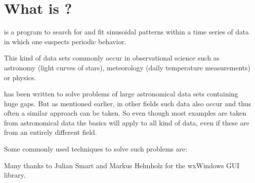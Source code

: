 \section{What is \periodname?}

\period is a program
to search for and fit sinusoidal patterns within a time series
of data in which one suspects periodic behavior.

This kind of data sets commonly occur in observational science such as
astronomy (light curves of stars), 
meteorology (daily temperature measurements)
or physics.

\period has been written to solve problems of large 
astronomical data sets containing huge gaps.
But as mentioned earlier, in other fields such data 
also occur and thus often a similar approach can be taken.
So even though most examples are taken from astronomical data 
the basics will apply to all kind of data, even if these are 
from an entirely different field.

Some commonly used techniques to solve such problems are:

Many thanks to Julian Smart and Markus Helmholz for the wxWindows GUI library.

